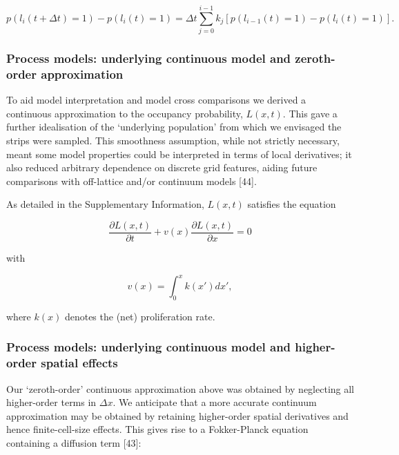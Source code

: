 \documentclass[10pt,letterpaper]{article}
\begin{document}
\begin{equation}p(l_i(t+\Delta t)=1) - p(l_i(t)=1) = \Delta t\sum_{j=0}^{i-1}k_j\left[p(l_{i-1}(t)=1)-p(l_i(t)=1)\right]. \label{eq:label-master-discrete-cons}\end{equation}

\subsubsection{Process models: underlying continuous model and zeroth-order
approximation}\label{underlying-continuous-model---zeroth-order-approximation}

To aid model interpretation and model cross comparisons we derived a
continuous approximation to the occupancy probability, \(L(x,t)\). This
gave a further idealisation of the `underlying population' from which we
envisaged the strips were sampled. This smoothness assumption, while not
strictly necessary, meant some model properties could be interpreted in
terms of local derivatives; it also reduced arbitrary dependence on
discrete grid features, aiding future comparisons with off-lattice
and/or continuum models {[}44{]}.

As detailed in the Supplementary Information, \(L(x,t)\) satisfies the
equation

\begin{equation}\frac{\partial L(x,t)}{\partial t} + v(x)\frac{\partial L(x,t)}{\partial x} = 0\label{eq:model-pde}\end{equation}

with

\begin{equation}v(x) = \int_0^{x} k(x') dx',\label{eq:model-veloc}\end{equation}

where \(k(x)\) denotes the (net) proliferation rate.

\subsubsection{Process models: underlying continuous model and higher-order
spatial effects}\label{underlying-continuous-model---higher-order-spatial-effects}

Our `zeroth-order' continuous approximation above was obtained by
neglecting all higher-order terms in \(\Delta x\). We anticipate that a
more accurate continuum approximation may be obtained by retaining
higher-order spatial derivatives and hence finite-cell-size effects.
This gives rise to a Fokker-Planck equation containing a diffusion term
{[}43{]}:
\end{document}

